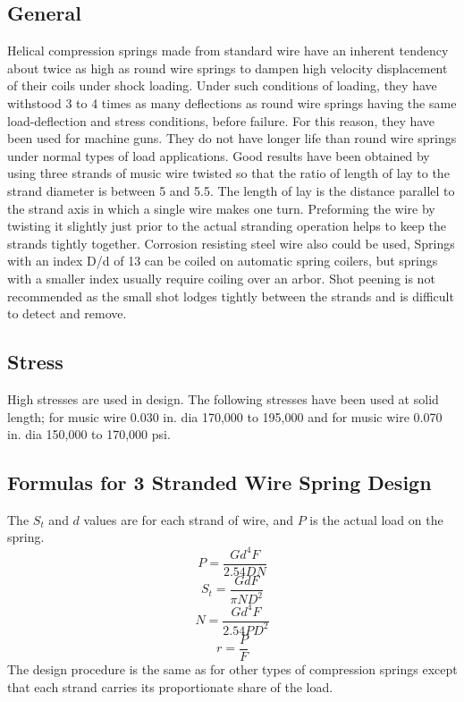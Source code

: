 \documentclass[10pt]{article}
\begin{document}
\subsection{General} %
Helical compression springs made from standard wire have an inherent tendency about twice as high as round wire
springs to dampen high velocity displacement of their coils under shock loading. 
Under such conditions of loading, they have withstood 3 to 4 times as many deflections as round wire springs having the same load-deflection and stress conditions, before failure.
For this reason, they have been used for machine guns. 
They do not have longer life than round wire springs under normal types of load applications. 
Good results have been obtained by using three strands of music wire twisted so that the ratio of length of lay to the strand diameter is between 5 and 5.5.
The length of lay is the distance parallel to the strand axis in which a single wire makes one turn. 
Preforming the wire by twisting it slightly just prior to the actual stranding operation helps to keep the strands tightly together. 
Corrosion resisting steel wire also could be used, Springs with an index D/d of 13 can be coiled on automatic spring coilers, but springs with a smaller index usually require coiling over an arbor.
Shot peening is not recommended as the small shot lodges tightly between the strands and is difficult to detect and remove.

\subsection{Stress} %
High stresses are used in design.
The following stresses have been used at solid length; for music wire 0.030 in. dia 170,000 to 195,000 and for music wire 0.070 in. dia 150,000 to 170,000 psi.

\subsection{Formulas for 3 Stranded Wire Spring Design} %
The $S_t$ and $d$ values are for each strand of wire, and $P$ is the actual load on the spring.
$$ P = \frac{G d^4 F}{2.54 D N} $$
$$ S_t = \frac{G d F}{\pi N D^2} $$
$$ N = \frac{G d^4 F}{2.54 P D^2} $$
$$ r = \frac{P}{F} $$
The design procedure is the same as for other types of compression springs except that each strand carries its proportionate share of the load.

\clearpage
\setcounter{section}{21} %
\end{document}
